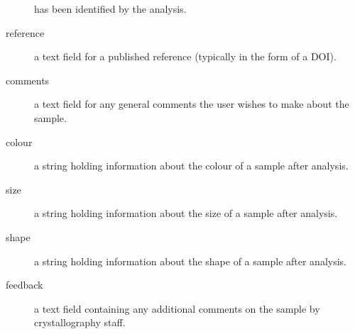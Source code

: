 \documentclass[12pt]{article}
\begin{document}
\begin{description}
has been identified by the analysis.
\item[reference]
a text field for a published reference (typically in the form of a DOI).
\item[comments]
a text field for any general comments the user wishes to make about the sample.
\item[colour]
a string holding information about the colour of a sample after analysis.
\item[size]
a string holding information about the size of a sample after analysis.
\item[shape]
a string holding information about the shape of a sample after analysis.
\item[feedback]
a text field containing any additional comments on the sample by
crystallography staff.
\end{description}
\end{document}
